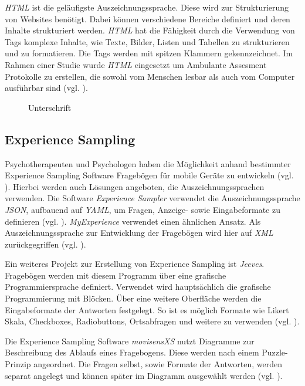 \emph{HTML} ist die geläufigste Auszeichnungssprache. Diese wird zur Strukturierung von Websites benötigt. Dabei können verschiedene Bereiche definiert und deren Inhalte strukturiert werden. \emph{HTML} hat die Fähigkeit durch die Verwendung von Tags komplexe Inhalte, wie Texte, Bilder, Listen und Tabellen zu strukturieren und zu formatieren. Die Tags werden mit spitzen Klammern gekennzeichnet. Im Rahmen einer Studie wurde \emph{HTML} eingesetzt um Ambulante Assesment Protokolle zu erstellen, die sowohl vom Menschen lesbar als auch vom Computer ausführbar sind (vgl. \cite{Batalas2018}).

\begin{figure}[h]
\centering
{}
\caption{Unterschrift}
\label{auszSpra}
\end{figure}


\subsection{Experience Sampling}
Psychotherapeuten und Psychologen haben die Möglichkeit anhand bestimmter Experience Sampling Software Fragebögen für mobile Geräte zu entwickeln (vgl. \cite{OSFSabri6:online}). Hierbei werden auch Lösungen angeboten, die  Auszeichnungssprachen verwenden. Die Software \emph{Experience Sampler} verwendet die Auszeichnungssprache \emph{JSON}, aufbauend auf \emph{YAML}, um Fragen, Anzeige- sowie Eingabeformate zu definieren (vgl. \cite{OSFSabri6:online}). \emph{MyExperience} verwendet einen ähnlichen Ansatz. Als Auszeichnungssprache zur Entwicklung der Fragebögen wird hier auf \emph{XML} zurückgegriffen (vgl. \cite{theMyExp48:online}).

Ein weiteres Projekt zur Erstellung von Experience Sampling ist \emph{Jeeves}. Fragebögen werden mit diesem Programm über eine grafische Programmiersprache definiert. Verwendet wird hauptsächlich die grafische Programmierung mit Blöcken. Über eine weitere Oberfläche werden die Eingabeformate der Antworten festgelegt. So ist es möglich Formate wie Likert Skala, Checkboxes, Radiobuttons, Ortsabfragen und weitere zu verwenden (vgl. \cite{Rough2017}).

Die Experience Sampling Software \emph{movisensXS} nutzt Diagramme zur Beschreibung des Ablaufs eines Fragebogens. Diese werden nach einem Puzzle-Prinzip angeordnet. Die Fragen selbst, sowie Formate der Antworten, werden separat angelegt und können später im Diagramm ausgewählt werden (vgl. \cite{movisens59:online}).

